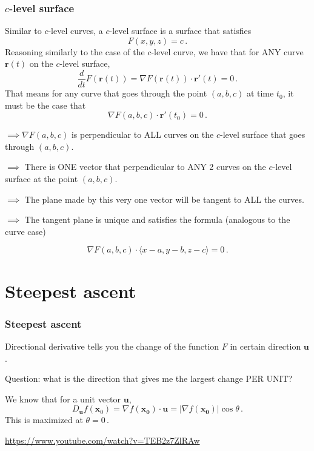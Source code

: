 \documentclass[aspectratio=169]{beamer}
\newcommand{\vect}{\mathbf}
\begin{document}
\begin{frame}
    \frametitle{$c$-level surface}
    Similar to $c$-level curves, a $c$-level surface is a surface that satisfies
    \begin{equation*}
        F(x,y,z) = c \,.
    \end{equation*}
    Reasoning similarly to the case of the $c$-level curve, we have that
    for ANY curve $\vect{r}(t)$ on the $c$-level surface,
    \begin{equation*}
        \frac{d}{dt} F(\vect{r}(t)) = \nabla F (\vect{r}(t)) \cdot \vect{r}'(t)= 0  \,.
    \end{equation*}
    That means for any curve that goes through the point $(a,b,c)$ at time $t_0$, it must be the case that
    \begin{equation*}
        \nabla F(a,b,c) \cdot \vect{r}'(t_0) = 0 \,.
    \end{equation*}
\end{frame}

\begin{frame}
    $\implies \nabla F(a,b,c)$ is perpendicular to ALL curves on the $c$-level surface
    that goes through $(a,b,c)$. \pause

    $\implies$ There is ONE vector that perpendicular to ANY 2 curves on the $c$-level surface at the point $(a,b,c)$. \pause

    $\implies$ The plane made by this very one vector will be tangent to ALL the curves. \pause

    $\implies$ The tangent plane is unique  and satisfies the formula (analogous to the
    curve case)

    \begin{equation*}
        \nabla F(a,b,c) \cdot \langle x-a, y-b, z-c \rangle = 0 \,.
    \end{equation*}

\end{frame}

\section{Steepest ascent}

\begin{frame}
    \frametitle{ Steepest ascent}
    Directional derivative tells you the change of the function $F$ in certain direction $\vect{u}$.

    Question: what is the direction that gives me the largest change PER UNIT? \pause

    We know that for a unit vector $\vect{u}$,
    \begin{equation*}
        D_{\vect{u}} f (\vect{x}_0) = \nabla f(\vect{x_0}) \cdot \vect{u} = | \nabla f(\vect{x_0})| \cos\theta \,.
    \end{equation*}
    \pause
    This is maximized at $\theta = 0$\,.

    \url{https://www.youtube.com/watch?v=TEB2z7ZlRAw}
\end{frame}
\end{document}
